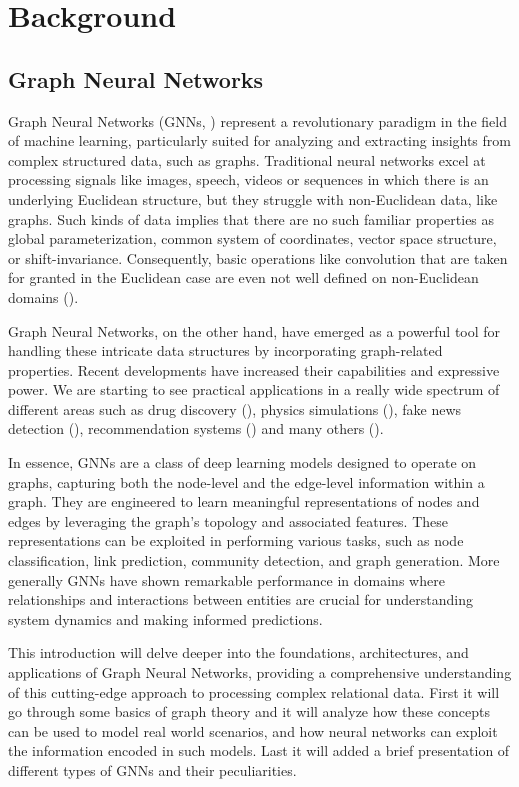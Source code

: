 \documentclass[binding=0.6cm,LaM]{sapthesis}
\newcommand{\mycite}[1]{(\cite{#1})}
\begin{document}
\chapter{Background}
\label{chap:2}
\section{Graph Neural Networks}
\label{sec:gnns}
Graph Neural Networks (GNNs, \cite{gnnModel2009}) represent a revolutionary paradigm in the field of machine learning, particularly suited for analyzing and extracting insights from complex structured data, such as graphs. Traditional neural networks excel at processing signals like images, speech, videos or sequences in which there is an underlying Euclidean structure, but they struggle with non-Euclidean data, like graphs. Such kinds of data implies that there are no such familiar properties as global parameterization, common system of coordinates, vector space structure, or shift-invariance. Consequently, basic operations like convolution that are taken for granted in the Euclidean case are even not well defined on non-Euclidean domains \mycite{Bronstein_2017}. 

Graph Neural Networks, on the other hand, have emerged as a powerful tool for handling these intricate data structures by incorporating graph-related properties. Recent developments have increased their capabilities and expressive power. We are starting to see practical applications in a really wide spectrum of different areas such as drug discovery \mycite{doi:10.1021/acs.jmedchem.9b00959}, physics simulations \mycite{sanchezgonzalez2020learning}, fake news detection \mycite{monti2019fake}, recommendation systems \mycite{eksombatchai2017pixie} and many others \mycite{hamilton2020graph}.

In essence, GNNs are a class of deep learning models designed to operate on graphs, capturing both the node-level and the edge-level information within a graph. They are engineered to learn meaningful representations of nodes and edges by leveraging the graph's topology and associated features. These representations can be exploited in performing various tasks, such as node classification, link prediction, community detection, and graph generation. More generally GNNs have shown remarkable performance in domains where relationships and interactions between entities are crucial for understanding system dynamics and making informed predictions.

This introduction will delve deeper into the foundations, architectures, and applications of Graph Neural Networks, providing a comprehensive understanding of this cutting-edge approach to processing complex relational data. First it will go through some basics of graph theory and it will analyze how these concepts can be used to model real world scenarios, and how neural networks  can exploit the information encoded in such models. Last it will added a brief presentation of different types of GNNs and their peculiarities.
\end{document}
